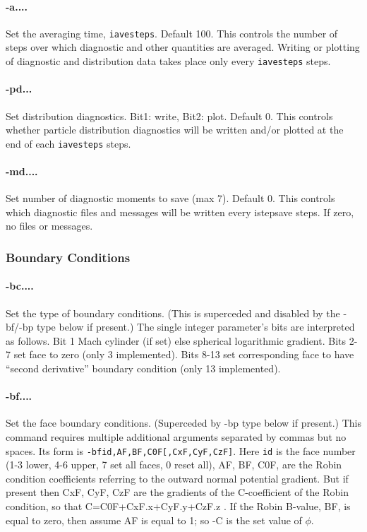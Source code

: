 \documentclass[12pt]{article}
\begin{document}
\paragraph{-a....}  Set the averaging time, \verb!iavesteps!. Default 100.
This controls the number of steps over which diagnostic and other
quantities are averaged. Writing or plotting of diagnostic and
distribution data takes place only every \verb!iavesteps! steps.

\paragraph{-pd...}
Set distribution diagnostics. Bit1: write, Bit2: plot. Default 0.
This controls whether particle distribution diagnostics will be
written and/or plotted at the end of each \verb!iavesteps! steps. 

\paragraph{-md....}  Set number of diagnostic moments to save (max 7). Default 0.
This controls which diagnostic files and messages will be written
every istepsave steps. If zero, no files or messages.

\subsubsection*{Boundary Conditions}

\paragraph{-bc....} Set the type of boundary conditions. (This is
superceded and disabled by the -bf/-bp type below if present.) The single
integer parameter's bits are interpreted as follows.  Bit 1 Mach
cylinder (if set) else spherical logarithmic gradient.  Bits 2-7 set
face to zero (only 3 implemented). Bits 8-13 set corresponding face to
have ``second derivative'' boundary condition (only 13 implemented).

\paragraph{-bf....} Set the face boundary conditions. (Superceded by
-bp type below if present.) This command requires multiple additional
arguments separated by commas but no spaces. Its form is
\verb!-bfid,AF,BF,C0F[,CxF,CyF,CzF]!. Here \verb!id! is the face
number (1-3 lower, 4-6 upper, 7 set all faces, 0 reset all), AF, BF,
C0F, are the Robin condition coefficients referring to the outward
normal potential gradient. But if present then CxF, CyF, CzF are the
gradients of the C-coefficient of the Robin condition, so that
C=C0F+CxF.x+CyF.y+CzF.z . If the Robin B-value, BF, is equal to zero,
then assume AF is equal to 1; so -C is the set value of $\phi$.
\end{document}
